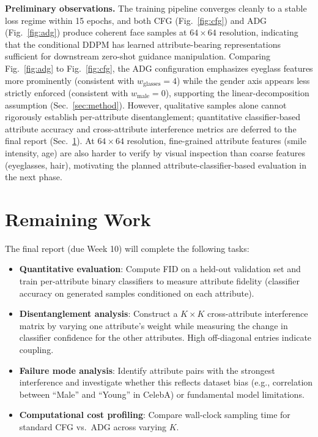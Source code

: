 \documentclass{article}
\begin{document}
\textbf{Preliminary observations.} The training pipeline converges cleanly to a stable loss regime within 15 epochs, and both CFG (Fig.~\ref{fig:cfg}) and ADG (Fig.~\ref{fig:adg}) produce coherent face samples at $64{\times}64$ resolution, indicating that the conditional DDPM has learned attribute-bearing representations sufficient for downstream zero-shot guidance manipulation. Comparing Fig.~\ref{fig:adg} to Fig.~\ref{fig:cfg}, the ADG configuration emphasizes eyeglass features more prominently (consistent with $w_{\text{glasses}}{=}4$) while the gender axis appears less strictly enforced (consistent with $w_{\text{male}}{=}0$), supporting the linear-decomposition assumption (Sec.~\ref{sec:method}). However, qualitative samples alone cannot rigorously establish per-attribute disentanglement; quantitative classifier-based attribute accuracy and cross-attribute interference metrics are deferred to the final report (Sec.~\ref{sec:remaining}). At $64{\times}64$ resolution, fine-grained attribute features (smile intensity, age) are also harder to verify by visual inspection than coarse features (eyeglasses, hair), motivating the planned attribute-classifier-based evaluation in the next phase.

\section{Remaining Work}
\label{sec:remaining}

The final report (due Week 10) will complete the following tasks:
\begin{itemize}
\item \textbf{Quantitative evaluation}: Compute FID on a held-out validation set and train per-attribute binary classifiers to measure attribute fidelity (classifier accuracy on generated samples conditioned on each attribute).
\item \textbf{Disentanglement analysis}: Construct a $K{\times}K$ cross-attribute interference matrix by varying one attribute's weight while measuring the change in classifier confidence for the other attributes. High off-diagonal entries indicate coupling.
\item \textbf{Failure mode analysis}: Identify attribute pairs with the strongest interference and investigate whether this reflects dataset bias (e.g., correlation between ``Male'' and ``Young'' in CelebA) or fundamental model limitations.
\item \textbf{Computational cost profiling}: Compare wall-clock sampling time for standard CFG vs.\ ADG across varying $K$.
\end{itemize}

\setlength{\bibsep}{2pt plus 0.3ex}
{\scriptsize


}
\end{document}
